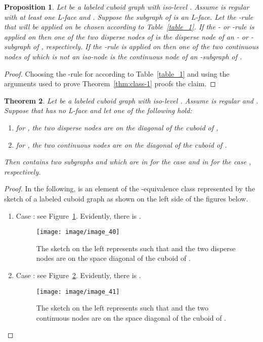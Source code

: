 \documentclass[a4paper,11pt]{article}
\newtheorem{theorem}{Theorem}[section]
\newtheorem{proposition}[theorem]{Proposition}
\begin{document}
\begin{proposition}
Let  be a labeled cuboid graph with iso-level . Assume  is regular with
at least one L-face and . Suppose the subgraph  of 
is an L-face. Let the -rule that will be applied on  be chosen according to Table~\ref{table_1}. If
the - or -rule is applied on  then one of the two disperse nodes of  is the disperse node
of an - or -subgraph of , respectively. If the -rule is applied on  then one of the
two continuous nodes of  which is not an iso-node is the continuous node of an -subgraph of .
\label{prop:class-3}
\end{proposition}
\begin{proof}
Choosing the -rule for  according to Table~\ref{table_1} and using the arguments used to prove
Theorem~\ref{thm:class-1} proofs the claim.
\end{proof}

\begin{theorem}\label{thm:class-2}
Let  be a labeled cuboid graph with iso-level . Assume  is regular
and . Suppose that  has no L-face and let one of the following hold:
\begin{enumerate}
\item[] for , the two disperse nodes are on the diagonal of the cuboid of ,
\item[] for , the two continuous nodes are on the diagonal of the cuboid of .
\end{enumerate}
Then  contains two subgraphs  and 
which are in  for the case  and in  for the case , respectively.
\end{theorem}
\begin{proof}In the following,  is an element of the -equivalence class represented by the
sketch of a labeled cuboid graph as shown on the left side of the figures below.
\begin{enumerate}
\item Case : see Figure~\ref{image_40}. Evidently, there is .
\FloatBarrier
\begin{figure}[!ht]
\texttt{[image: image/image\_40]}
\caption{The sketch on the left represents  such that  and the two disperse nodes
are on the space diagonal of the cuboid of .}
\label{image_40}
\end{figure}
\FloatBarrier
\item Case : see Figure~\ref{image_41}. Evidently, there is .
\begin{figure}[!ht]
\texttt{[image: image/image\_41]}
\caption{The sketch on the left represents  such that  and the two
continuous nodes are on the space diagonal of the cuboid of .}
\label{image_41}
\end{figure}
\FloatBarrier
\end{enumerate}
\vspace{-0.9cm}
\end{proof}
\FloatBarrier
\end{document}
